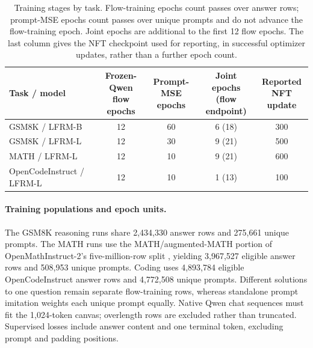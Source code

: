 \documentclass{article}
\begin{document}
\begin{table}[!htb]
\centering\small
\setlength{\tabcolsep}{5pt}
\caption{Training stages by task. Flow-training epochs count passes over answer rows; prompt-MSE epochs count passes over unique prompts and do not advance the flow-training epoch. Joint epochs are additional to the first 12 flow epochs. The last column gives the NFT checkpoint used for reporting, in successful optimizer updates, rather than a further epoch count.}
\label{tab:trainingstages}
\begin{tabular}{@{}lcccc@{}}
\toprule
Task / model & \shortstack{Frozen-Qwen\\flow epochs} & \shortstack{Prompt-MSE\\epochs} & \shortstack{Joint epochs\\(flow endpoint)} & \shortstack{Reported\\NFT update}\\
\midrule
GSM8K / LFRM-B & 12 & 60 & 6 (18) & 300\\
GSM8K / LFRM-L & 12 & 30 & 9 (21) & 500\\
MATH / LFRM-L & 12 & 10 & 9 (21) & 600\\
OpenCodeInstruct / LFRM-L & 12 & 10 & 1 (13) & 100\\
\bottomrule
\end{tabular}
\end{table}

\paragraph{Training populations and epoch units.}
The GSM8K reasoning runs share 2,434,330 answer rows and 275,661 unique prompts. The MATH runs use the MATH/augmented-MATH portion of OpenMathInstruct-2's five-million-row split \citep{openmath}, yielding 3,967,527 eligible answer rows and 508,953 unique prompts. Coding uses 4,893,784 eligible OpenCodeInstruct answer rows and 4,772,508 unique prompts. Different solutions to one question remain separate flow-training rows, whereas standalone prompt imitation weights each unique prompt equally. Native Qwen chat sequences must fit the 1,024-token canvas; overlength rows are excluded rather than truncated. Supervised losses include answer content and one terminal token, excluding prompt and padding positions.
\end{document}
